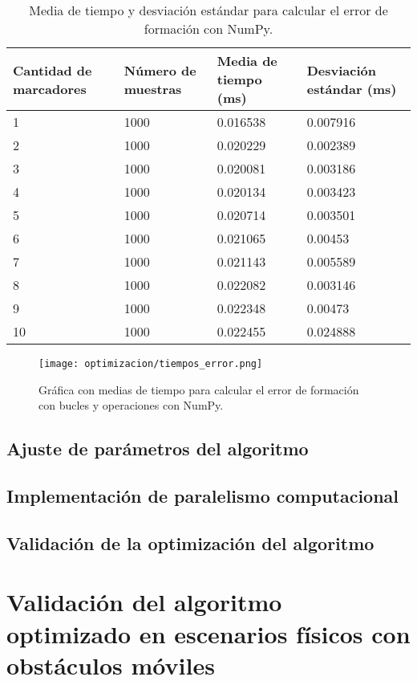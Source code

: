 \begin{table}[H]
	\centering
	\resizebox{\textwidth}{!} {
	\begin{tabular}{|l|l|l|l|}
		\hline
		\textbf{Cantidad de marcadores} & \textbf{Número de muestras} & \textbf{Media de tiempo (ms)} & \textbf{Desviación estándar (ms)} \\ \hline
		1 & 1000 & 0.016538 & 0.007916 \\ \hline
		2 & 1000 & 0.020229 & 0.002389 \\ \hline
		3 & 1000 & 0.020081 & 0.003186 \\ \hline
		4 & 1000 & 0.020134 & 0.003423 \\ \hline
		5 & 1000 & 0.020714 & 0.003501 \\ \hline
		6 & 1000 & 0.021065 & 0.00453 \\ \hline
		7 & 1000 & 0.021143 & 0.005589 \\ \hline
		8 & 1000 & 0.022082 & 0.003146 \\ \hline
		9 & 1000 & 0.022348 & 0.00473 \\ \hline
		10 & 1000 & 0.022455 & 0.024888 \\ \hline
	\end{tabular}}
	\caption{Media de tiempo y desviación estándar para calcular el error de formación con NumPy.}
	\label{cuadro:tiempos_error_numpy}
\end{table}

\begin{figure}[H]
	\centering
	\texttt{[image: optimizacion/tiempos\_error.png]}
	\caption{Gráfica con medias de tiempo para calcular el error de formación con bucles y operaciones con NumPy.}
	\label{fig:grafica_tiempos_error}
\end{figure}

\section{Ajuste de parámetros del algoritmo}

\section{Implementación de paralelismo computacional}

\section{Validación de la optimización del algoritmo}

\chapter{Validación del algoritmo optimizado en escenarios físicos con obstáculos móviles}\label{cap:validacion}






